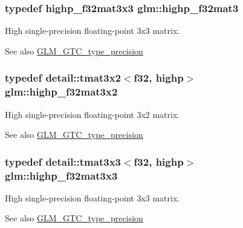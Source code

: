 \subsubsection[{\texorpdfstring{highp\+\_\+f32mat3}{highp_f32mat3}}]{\setlength{\rightskip}{0pt plus 5cm}typedef highp\+\_\+f32mat3x3 {\bf glm\+::highp\+\_\+f32mat3}}\hypertarget{group__gtc__type__precision_ga06809818db73785334f839742a9ad85a}{}\label{group__gtc__type__precision_ga06809818db73785334f839742a9ad85a}
High single-\/precision floating-\/point 3x3 matrix. \begin{DoxySeeAlso}{See also}
\hyperlink{group__gtc__type__precision}{G\+L\+M\+\_\+\+G\+T\+C\+\_\+type\+\_\+precision} 
\end{DoxySeeAlso}
\subsubsection[{\texorpdfstring{highp\+\_\+f32mat3x2}{highp_f32mat3x2}}]{\setlength{\rightskip}{0pt plus 5cm}typedef detail\+::tmat3x2$<$f32, highp$>$ {\bf glm\+::highp\+\_\+f32mat3x2}}\hypertarget{group__gtc__type__precision_gaf36b2b34ea881977c61491b0d3b25a28}{}\label{group__gtc__type__precision_gaf36b2b34ea881977c61491b0d3b25a28}
High single-\/precision floating-\/point 3x2 matrix. \begin{DoxySeeAlso}{See also}
\hyperlink{group__gtc__type__precision}{G\+L\+M\+\_\+\+G\+T\+C\+\_\+type\+\_\+precision} 
\end{DoxySeeAlso}
\subsubsection[{\texorpdfstring{highp\+\_\+f32mat3x3}{highp_f32mat3x3}}]{\setlength{\rightskip}{0pt plus 5cm}typedef detail\+::tmat3x3$<$f32, highp$>$ {\bf glm\+::highp\+\_\+f32mat3x3}}\hypertarget{group__gtc__type__precision_ga334eca23d23aef90972fb20c5b749ca3}{}\label{group__gtc__type__precision_ga334eca23d23aef90972fb20c5b749ca3}
High single-\/precision floating-\/point 3x3 matrix. \begin{DoxySeeAlso}{See also}
\hyperlink{group__gtc__type__precision}{G\+L\+M\+\_\+\+G\+T\+C\+\_\+type\+\_\+precision} 
\end{DoxySeeAlso}
